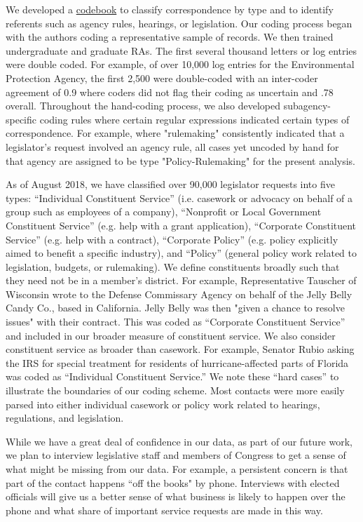 \documentclass{article}
\begin{document}
We developed a \href{https://docs.google.com/document/d/1fJxjXjAyRL9vX-16fSsH29anXZc-W74GMf_7BSgWkws/edit}{codebook} to classify correspondence by type and to identify referents such as agency rules, hearings, or legislation. Our coding process began with the authors coding a representative sample of records. We then trained undergraduate and graduate RAs. The first several thousand letters or log entries were double coded. For example, of over 10,000 log entries for the Environmental Protection Agency, the first 2,500 were double-coded with an inter-coder agreement of 0.9 where coders did not flag their coding as uncertain and .78 overall. Throughout the hand-coding process, we also developed subagency-specific coding rules where certain regular expressions indicated certain types of correspondence. For example, where "rulemaking" consistently indicated that a legislator's request involved an agency rule, all cases yet uncoded by hand for that agency are assigned to be type "Policy-Rulemaking" for the present analysis. 

As of August 2018, we have classified over 90,000 legislator requests into five types: ``Individual Constituent Service'' (i.e. casework or advocacy on behalf of a group such as employees of a company), ``Nonprofit or Local Government Constituent Service'' (e.g. help with a grant application), ``Corporate Constituent Service'' (e.g. help with a contract), ``Corporate Policy'' (e.g. policy explicitly aimed to benefit a specific industry), and ``Policy'' (general policy work related to legislation, budgets, or rulemaking). 
We define constituents broadly such that they need not be in a member's district. For example, Representative Tauscher of Wisconsin wrote to the Defense Commissary Agency on behalf of the Jelly Belly Candy Co., based in California. Jelly Belly was then "given a chance to resolve issues" with their contract. This was coded as ``Corporate Constituent Service'' and included in our broader measure of constituent service.  We also consider constituent service as broader than casework. For example, Senator Rubio asking the IRS for special treatment for residents of hurricane-affected parts of Florida was coded as ``Individual Constituent Service.'' We note these ``hard cases'' to illustrate the boundaries of our coding scheme. Most contacts were more easily parsed into either individual casework or policy work related to hearings, regulations, and legislation.

While we have a great deal of confidence in our data, as part of our future work, we plan to interview legislative staff and members of Congress to get a sense of what might be missing from our data. For example, a persistent concern is that part of the contact happens ``off the books" by phone.  Interviews with elected officials will give us a better sense of what business is likely to happen over the phone and what share of important service requests are made in this way.  
\end{document}
